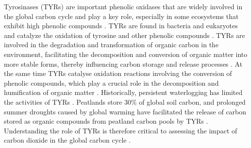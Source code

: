 \documentclass[12pt]{article}
\begin{document}
Tyrosinases (TYRs) are important phenolic oxidases that are widely involved in the global carbon cycle and play a key role, especially in some ecosystems that exhibit high phenolic compounds \citep{panis2022novel,panis2021expression}. TYRs are found in bacteria and eukaryotes and catalyze the oxidation of tyrosine and other phenolic compounds \citep{panis2022novel,hassan2023tyrosinase,panis2021expression}. TYRs are involved in the degradation and transformation of organic carbon in the environment, facilitating the decomposition and conversion of organic matter into more stable forms, thereby influencing carbon storage and release processes \citep{de2020microbial}. At the same time TYRs catalyse oxidation reactions involving the conversion of phenolic compounds, which play a crucial role in the decomposition and humification of organic matter \citep{de2020microbial}. Historically, persistent waterlogging has limited the activities of TYRs \citep{panis2021expression}. Peatlands store 30\% of global soil carbon, and prolonged summer droughts caused by global warming have facilitated the release of carbon stored as organic compounds from peatland carbon pools by TYRs \citep{panis2021expression}. Understanding the role of TYRs is therefore critical to assessing the impact of carbon dioxide in the global carbon cycle \citep{panis2021expression}.\\\\
\end{document}
